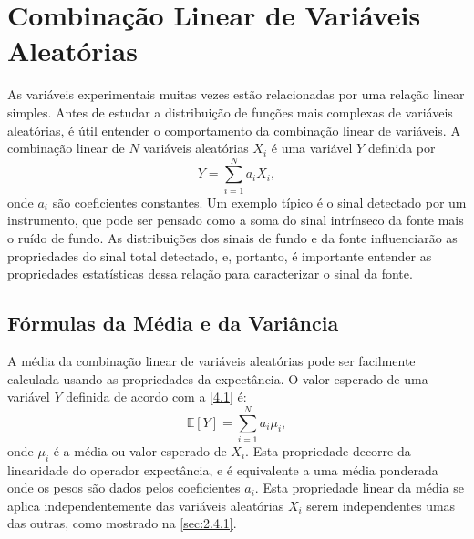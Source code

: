 \section{Combinação Linear de Variáveis Aleatórias}

As variáveis experimentais muitas vezes estão relacionadas por uma relação linear simples. Antes de estudar a distribuição de funções mais complexas de variáveis aleatórias, é útil entender o comportamento da combinação linear de variáveis. A combinação linear de $N$ variáveis aleatórias $X_i$ é uma variável $Y$ definida por
\begin{equation}\label{4.1}
 Y = \sum_{i=1}^{N} a_i X_i,
\end{equation}
onde $a_i$ são coeficientes constantes. Um exemplo típico é o sinal detectado por um instrumento, que pode ser pensado como a soma do sinal intrínseco da fonte mais o ruído de fundo. As distribuições dos sinais de fundo e da fonte influenciarão as propriedades do sinal total detectado, e, portanto, é importante entender as propriedades estatísticas dessa relação para caracterizar o sinal da fonte.

\subsection{Fórmulas da Média e da Variância}

A média da combinação linear de variáveis aleatórias pode ser facilmente calculada usando as propriedades da expectância. O valor esperado de uma variável $Y$ definida de acordo com a \autoref{4.1} é:
\begin{equation}
\mathbb{E}[Y] = \sum_{i=1}^{N} a_i \mu_i,
\end{equation}
onde $ \mu_i $ é a média ou valor esperado de $ X_i $. Esta propriedade decorre da linearidade do operador expectância, e é equivalente a uma média ponderada onde os pesos são dados pelos coeficientes $ a_i $. Esta propriedade linear da média se aplica independentemente das variáveis aleatórias $ X_i $ serem independentes umas das outras, como mostrado na \autoref{sec:2.4.1}.

